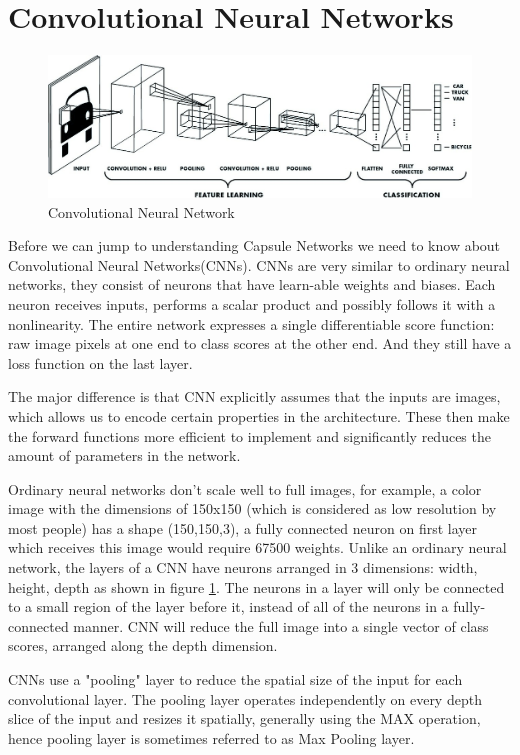 \section{Convolutional Neural Networks} %
\label{sec:convolutional_neural_networks}

\begin{figure}[H]
\centering\includegraphics[width=.7\textwidth]{images/CNN.jpg}
\caption{Convolutional Neural Network}
\label{fig:cnn}
\end{figure}
Before we can jump to understanding Capsule Networks we need to know about Convolutional Neural Networks(CNNs). CNNs are very similar to ordinary neural networks, they consist of neurons that have learn-able weights and biases. Each neuron receives inputs, performs a scalar product and possibly follows it with a nonlinearity. The entire network expresses a single differentiable score function: raw image pixels at one end to class scores at the other end. And they still have a loss function on the last layer.\par\bigskip
The major difference is that CNN explicitly assumes that the inputs are images, which allows us to encode certain properties in the architecture. These then make the forward functions more efficient to implement and significantly reduces the amount of parameters in the network.\par\bigskip
Ordinary neural networks don’t scale well to full images, for example, a color image with the dimensions of 150x150 (which is considered as low resolution by most people) has a shape (150,150,3), a fully connected neuron on first layer which receives this image would require 67500 weights. Unlike an ordinary neural network, the layers of a CNN have neurons arranged in 3 dimensions: width, height, depth as shown in figure \ref{fig:cnn}. The neurons in a layer will only be connected to a small region of the layer before it, instead of all of the neurons in a fully-connected manner. CNN  will reduce the full image into a single vector of class scores, arranged along the depth dimension.\par\bigskip
CNNs use a "pooling" layer to reduce the spatial size of the input for each convolutional layer. The pooling layer operates independently on every depth slice of the input and resizes it spatially, generally using the MAX operation, hence pooling layer is sometimes referred to as Max Pooling layer.

